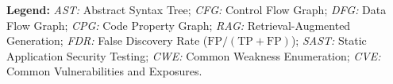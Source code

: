 \documentclass[10pt]{article}
\begin{document}
\vspace{5pt}
\noindent\scriptsize
\textbf{Legend:} \textit{AST:} Abstract Syntax Tree; \textit{CFG:} Control Flow Graph; \textit{DFG:} Data Flow Graph; \textit{CPG:} Code Property Graph; \textit{RAG:} Retrieval-Augmented Generation; \textit{FDR:} False Discovery Rate ($\text{FP}/(\text{TP} + \text{FP})$); \textit{SAST:} Static Application Security Testing; \textit{CWE:} Common Weakness Enumeration; \textit{CVE:} Common Vulnerabilities and Exposures.
\end{document}
